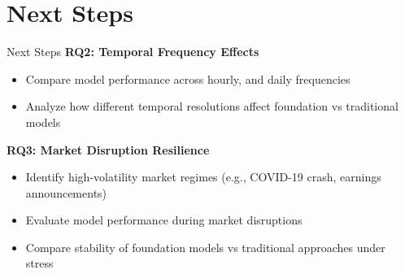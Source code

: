\documentclass[aspectratio=169]{beamer}
\begin{document}
\section{Next Steps}

\begin{frame}{Next Steps}
\textbf{RQ2: Temporal Frequency Effects}
\begin{itemize}
\item Compare model performance across hourly, and daily frequencies
\item Analyze how different temporal resolutions affect foundation vs traditional models
\end{itemize}

\vspace{1em}

\textbf{RQ3: Market Disruption Resilience}
\begin{itemize}
\item Identify high-volatility market regimes (e.g., COVID-19 crash, earnings announcements)
\item Evaluate model performance during market disruptions
\item Compare stability of foundation models vs traditional approaches under stress
\end{itemize}


\end{frame}


\end{document}
